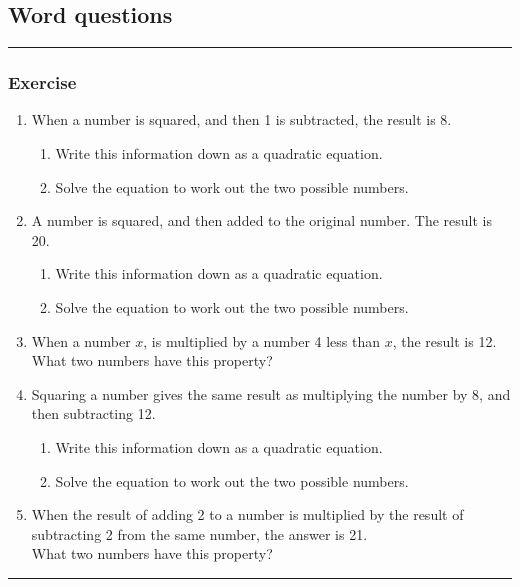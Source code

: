 \documentclass[a4paper,12pt]{article}
\newcommand\question{
	 \rule[0pt]{17cm}{0.5pt}\vspace{-0.5cm}
	\subsubsection{Exercise}

}
\newcommand\questionend{
	\rule[0pt]{17cm}{0.5pt}\vspace{0.0cm}\\
}
\begin{document}
\subsection{Word questions}
\question
	\begin{enumerate}[label=\normalsize \alph*)~~~]
		\item When a number is squared, and then 1 is subtracted, the result is 8.
		\begin{enumerate}[label=\normalsize \roman*)]
			\item Write this information down as a quadratic equation.
			\item Solve the equation to work out the two possible numbers.
		\end{enumerate}
	\item A number is squared, and then added to the original number. The result is 20.
	\begin{enumerate}[label=\normalsize \roman*)]
	\item Write this information down as a quadratic equation.
	\item Solve the equation to work out the two possible numbers.
		\end{enumerate}
	\item When a number $x$, is multiplied by a number 4 less than $x$, the result is 12.\\
	What two numbers have this property?
	\item Squaring a number gives the same result as multiplying the number by 8, and then subtracting 12.
	\begin{enumerate}[label=\normalsize \roman*)]
		\item Write this information down as a quadratic equation.
		\item Solve the equation to work out the two possible numbers.
	\end{enumerate}
	\item When the result of adding 2 to a number is multiplied by the result of subtracting  2 
	from the same number, the answer is 21. \\
	What two numbers have this property?
	\end{enumerate}
\questionend
\newpage
\end{document}
